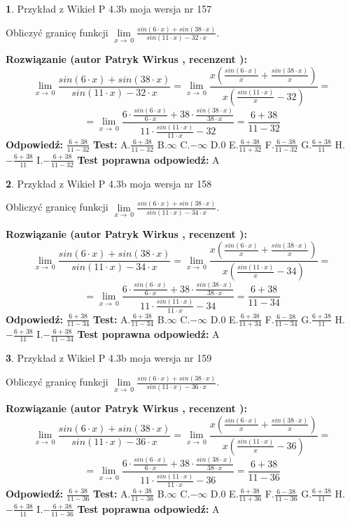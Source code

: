 \documentclass[12pt, a4paper]{article}
\theoremstyle{definition} %
\newtheorem{zad}{}
\newcommand{\zadStart}[1]{\begin{zad}#1\newline}
\newcommand{\zadStop}{\end{zad}}
\newcommand{\rozwStart}[2]{\noindent \textbf{Rozwiązanie (autor #1 , recenzent #2): }\newline}
\newcommand{\rozwStop}{\newline}
\newcommand{\odpStart}{\noindent \textbf{Odpowiedź:}\newline}
\newcommand{\odpStop}{\newline}
\newcommand{\testStart}{\noindent \textbf{Test:}\newline}
\newcommand{\testStop}{\newline}
\newcommand{\kluczStart}{\noindent \textbf{Test poprawna odpowiedź:}\newline}
\newcommand{\kluczStop}{\newline}
\begin{document}
\zadStart{Przykład z Wikieł P 4.3b moja wersja nr 157}


Obliczyć granicę funkcji $\lim\limits_{x\to\ 0}\frac{sin(6 \cdot x)+sin(38 \cdot x)}{sin(11 \cdot x)-32 \cdot x}$.
\zadStop
\rozwStart{Patryk Wirkus}{}
$$\lim\limits_{x\to\ 0}\frac{sin(6 \cdot x)+sin(38 \cdot x)}{sin(11 \cdot x)-32 \cdot x}=\lim\limits_{x\to\ 0}\frac{x(\frac{sin(6 \cdot x)}{x}+\frac{sin(38 \cdot x)}{x})}{x(\frac{sin(11 \cdot x)}{x}-32)}=$$
$$=\lim\limits_{x\to\ 0}\frac{6 \cdot \frac{sin(6 \cdot x)}{6 \cdot x}+38 \cdot \frac{sin(38 \cdot x)}{38 \cdot x}}{11 \cdot \frac{sin(11 \cdot x)}{11 \cdot x}-32}=\frac{6+38}{11-32}$$
\rozwStop
\odpStart
$\frac{6+38}{11-32}$
\odpStop
\testStart
A.$\frac{6+38}{11-32}$
B.$\infty$
C.$-\infty$
D.$0$
E.$\frac{6+38}{11+32}$
F.$\frac{6-38}{11-32}$
G.$\frac{6+38}{11}$
H.$-\frac{6+38}{11}$
I.$-\frac{6+38}{11-32}$
\testStop
\kluczStart
A
\kluczStop



\zadStart{Przykład z Wikieł P 4.3b moja wersja nr 158}


Obliczyć granicę funkcji $\lim\limits_{x\to\ 0}\frac{sin(6 \cdot x)+sin(38 \cdot x)}{sin(11 \cdot x)-34 \cdot x}$.
\zadStop
\rozwStart{Patryk Wirkus}{}
$$\lim\limits_{x\to\ 0}\frac{sin(6 \cdot x)+sin(38 \cdot x)}{sin(11 \cdot x)-34 \cdot x}=\lim\limits_{x\to\ 0}\frac{x(\frac{sin(6 \cdot x)}{x}+\frac{sin(38 \cdot x)}{x})}{x(\frac{sin(11 \cdot x)}{x}-34)}=$$
$$=\lim\limits_{x\to\ 0}\frac{6 \cdot \frac{sin(6 \cdot x)}{6 \cdot x}+38 \cdot \frac{sin(38 \cdot x)}{38 \cdot x}}{11 \cdot \frac{sin(11 \cdot x)}{11 \cdot x}-34}=\frac{6+38}{11-34}$$
\rozwStop
\odpStart
$\frac{6+38}{11-34}$
\odpStop
\testStart
A.$\frac{6+38}{11-34}$
B.$\infty$
C.$-\infty$
D.$0$
E.$\frac{6+38}{11+34}$
F.$\frac{6-38}{11-34}$
G.$\frac{6+38}{11}$
H.$-\frac{6+38}{11}$
I.$-\frac{6+38}{11-34}$
\testStop
\kluczStart
A
\kluczStop



\zadStart{Przykład z Wikieł P 4.3b moja wersja nr 159}


Obliczyć granicę funkcji $\lim\limits_{x\to\ 0}\frac{sin(6 \cdot x)+sin(38 \cdot x)}{sin(11 \cdot x)-36 \cdot x}$.
\zadStop
\rozwStart{Patryk Wirkus}{}
$$\lim\limits_{x\to\ 0}\frac{sin(6 \cdot x)+sin(38 \cdot x)}{sin(11 \cdot x)-36 \cdot x}=\lim\limits_{x\to\ 0}\frac{x(\frac{sin(6 \cdot x)}{x}+\frac{sin(38 \cdot x)}{x})}{x(\frac{sin(11 \cdot x)}{x}-36)}=$$
$$=\lim\limits_{x\to\ 0}\frac{6 \cdot \frac{sin(6 \cdot x)}{6 \cdot x}+38 \cdot \frac{sin(38 \cdot x)}{38 \cdot x}}{11 \cdot \frac{sin(11 \cdot x)}{11 \cdot x}-36}=\frac{6+38}{11-36}$$
\rozwStop
\odpStart
$\frac{6+38}{11-36}$
\odpStop
\testStart
A.$\frac{6+38}{11-36}$
B.$\infty$
C.$-\infty$
D.$0$
E.$\frac{6+38}{11+36}$
F.$\frac{6-38}{11-36}$
G.$\frac{6+38}{11}$
H.$-\frac{6+38}{11}$
I.$-\frac{6+38}{11-36}$
\testStop
\kluczStart
A
\kluczStop
\end{document}
